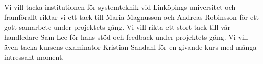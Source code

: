 Vi vill tacka institutionen för systemteknik vid Linköpings universitet och framförallt riktar vi ett tack till Maria Magnusson och Andreas Robinsson för ett gott samarbete under projektets gång. Vi vill rikta ett stort tack till vår handledare Sam Lee för hans stöd och feedback under projektets gång. Vi vill även tacka kursens examinator Kristian Sandahl för en givande kurs med många intressant moment.

